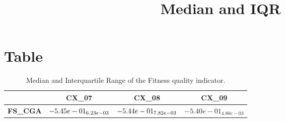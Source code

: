 \documentclass{article}
\title{Median and IQR}
\author{}
\begin{document}
\maketitle
\section{Table}
\begin{table}[!htp]
  \caption{Median and Interquartile Range of the Fitness quality indicator.}
  \label{table:Fitness}
  \centering
  \begin{scriptsize}
  \begin{tabular}{c|ccc}
      & \textbf{CX\_07} & \textbf{CX\_08} & \textbf{CX\_09} \\\hline
      \textbf{FS_CGA} & $\cellcolor{gray25} -5.45e-01_{6.23e-03} $ & $ \cellcolor{gray95} -5.44e-01_{7.82e-03} $ & $ -5.40e-01_{4.80e-03}$ \\
  \end{tabular}
  \end{scriptsize}
\end{table}
\end{document}
